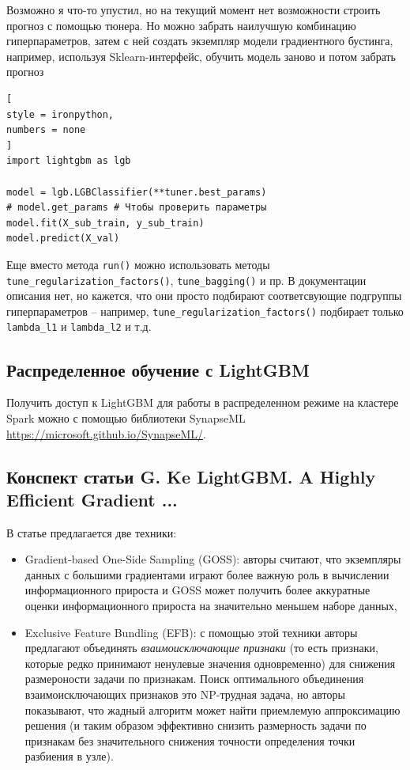 \documentclass[%
	11pt,
	a4paper,
	utf8,
		]{article}
\begin{document}
Возможно я что-то упустил, но на текущий момент нет возможности строить прогноз с помощью тюнера. Но можно забрать наилучшую комбинацию гиперпараметров, затем с ней создать экземпляр модели градиентного бустинга, например, используя Sklearn-интерфейс, обучить модель заново и потом забрать прогноз
\begin{lstlisting}[
style = ironpython,
numbers = none
]
import lightgbm as lgb

model = lgb.LGBClassifier(**tuner.best_params)
# model.get_params # Чтобы проверить параметры
model.fit(X_sub_train, y_sub_train)
model.predict(X_val)
\end{lstlisting}

Еще вместо метода \verb|run()| можно использовать методы \verb|tune_regularization_factors()|, \verb|tune_bagging()| и пр. В документации описания нет, но кажется, что они просто подбирают соответсвующие подгруппы гиперпараметров -- например, \verb|tune_regularization_factors()| подбирает только \verb|lambda_l1| и \verb|lambda_l2| и т.д.


\subsection{Распределенное обучение с LightGBM}

Получить доступ к LightGBM для работы в распределенном режиме на кластере Spark можно с помощью библиотеки SynapseML \url{https://microsoft.github.io/SynapseML/}.

\subsection{Конспект статьи G. Ke LightGBM. A Highly Efficient Gradient ...}

В статье предлагается две техники:
\begin{itemize}
	\item Gradient-based One-Side Sampling (GOSS): авторы считают, что экземпляры данных с большими градиентами играют более важную роль в вычислении информационного прироста и GOSS может получить более аккуратные оценки информационного прироста на значительно меньшем наборе данных,
	
	\item Exclusive Feature Bundling (EFB): с помощью этой техники авторы предлагают объединять \emph{взаимоисключающие признаки} (то есть признаки, которые редко принимают ненулевые значения одновременно) для снижения размероности задачи по признакам. Поиск оптимального объединения взаимоисключающих признаков это NP-трудная задача, но авторы показывают, что жадный алгоритм может найти приемлемую аппроксимацию решения (и таким образом эффективно снизить размерность задачи по признакам без значительного снижения точности определения точки разбиения в узле).
\end{itemize}
\end{document}
